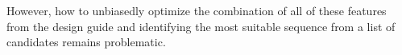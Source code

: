 However, how to unbiasedly optimize the combination of all of these features from the design guide and identifying the most suitable sequence from a list of candidates remains problematic.